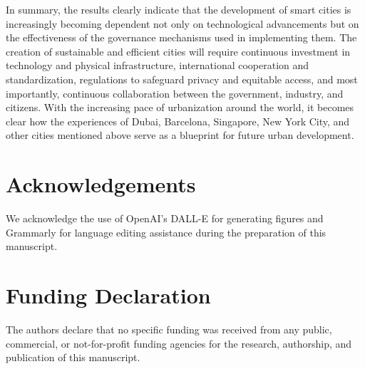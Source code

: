 \documentclass[pdflatex,sn-mathphys-num]{sn-jnl}%
\theoremstyle{thmstyleone}%
\theoremstyle{thmstyletwo}%
\theoremstyle{thmstylethree}%
\begin{document}
In summary, the results clearly indicate that the development of smart cities is increasingly becoming dependent not only on technological advancements but on the effectiveness of the governance mechanisms used in implementing them. The creation of sustainable and efficient cities will require continuous investment in technology and physical infrastructure, international cooperation and standardization, regulations to safeguard privacy and equitable access, and most importantly, continuous collaboration between the government, industry, and citizens. With the increasing pace of urbanization around the world, it becomes clear how the experiences of Dubai, Barcelona, Singapore, New York City, and other cities mentioned above serve as a blueprint for future urban development.

\section*{Acknowledgements}
We acknowledge the use of OpenAI's DALL-E for generating figures and Grammarly for language editing assistance during the preparation of this manuscript.

\section*{Funding Declaration}
The authors declare that no specific funding was received from any public, commercial, or not-for-profit funding agencies for the research, authorship, and publication of this manuscript.
\end{document}
